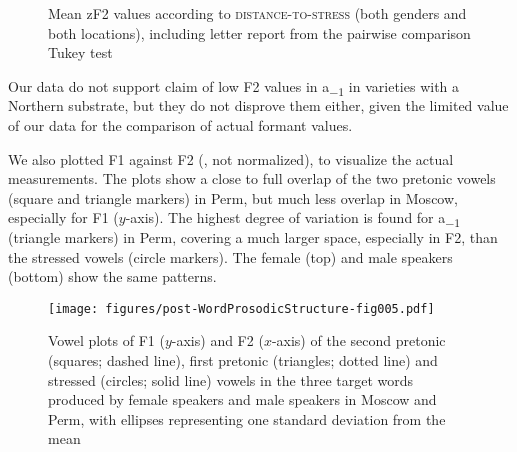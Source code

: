 \documentclass[output=paper,colorlinks,citecolor=black]{langscibook}
\begin{document}
\begin{figure}
    \caption{Mean zF2 values according to \textsc{distance-to-stress} (both genders and both locations), including letter report from the pairwise comparison Tukey test}
    \label{post:fig:mean-zF2}
\end{figure}

Our data do not support  claim of low F2 values in a\textsubscript{\tiny{$-1$}} in varieties with a Northern substrate, but they do not disprove them either, given the limited value of our data for the comparison of actual formant values.

We also plotted F1 against F2 (, not normalized), to visualize the actual measurements. The plots show a close to full overlap of the two pretonic vowels (square and triangle markers) in Perm, but much less overlap in Moscow, especially for F1 ($y${}-axis). The highest degree of variation is found for a\textsubscript{\tiny{$-1$}} (triangle markers) in Perm, covering a much larger space, especially in F2, than the stressed vowels (circle markers). The female (top) and male speakers (bottom) show the same patterns.


\begin{figure}
    \texttt{[image: figures/post-WordProsodicStructure-fig005.pdf]}
    \caption{Vowel plots of F1 ($y$-axis) and F2 ($x$-axis) of the second pretonic (squares; dashed line), first pretonic (triangles; dotted line) and stressed (circles; solid line) vowels in the three target words produced by female speakers and male speakers in Moscow and Perm, with ellipses representing one standard deviation from the mean}
    \label{post:fig:vowel-plot}
\end{figure}
\end{document}
